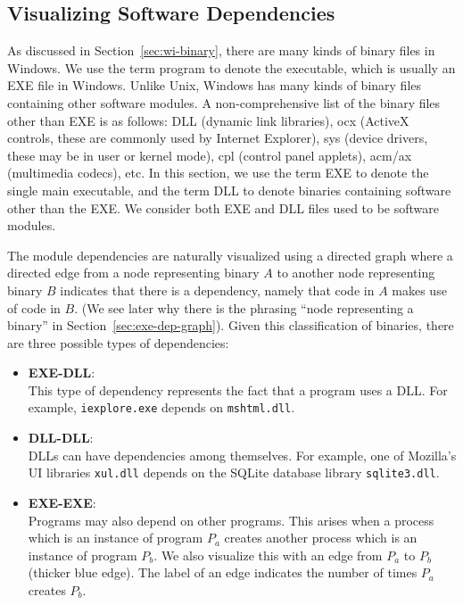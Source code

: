\subsection{Visualizing Software Dependencies}

As discussed in Section~\ref{sec:wi-binary},
there are many kinds of binary files in Windows.
We use the term program to denote the executable, which
is usually an EXE file in Windows.
Unlike Unix, Windows has many kinds of binary files containing
other software modules.
A non-comprehensive list of the binary files other than EXE
is as follows:
DLL (dynamic link libraries), ocx (ActiveX controls,
these are commonly used by Internet Explorer), sys (device
drivers, these may be in user or kernel mode), cpl (control panel applets),
acm/ax (multimedia codecs), etc.
In this section, we use the term EXE to denote the single main executable,
and the term DLL to denote binaries containing software other than the EXE.
We consider both EXE and DLL files used to be software modules.

The module dependencies are naturally visualized using a directed graph where
a directed edge from a node representing binary $A$ to another
node representing binary $B$ indicates that there is
a dependency, namely that code in $A$ makes use of code in $B$.
(We see later why there is the phrasing ``node representing a binary'' in
Section~\ref{sec:exe-dep-graph}).
Given this classification of binaries, there are three possible
types of dependencies:
\begin{itemize}
\item {\bf EXE-DLL}: \\
This type of dependency represents the fact that a program uses a DLL.
For example, {\tt iexplore.exe} depends on {\tt mshtml.dll}.
\item {\bf DLL-DLL}: \\
DLLs can have dependencies among themselves.
For example, one of Mozilla's UI libraries {\tt xul.dll} depends on the SQLite
database library {\tt sqlite3.dll}.
\item {\bf EXE-EXE}: \\
Programs may also depend on other programs. This arises when a process
which is an instance of program $P_a$ creates another process
which is an instance of program $P_b$.
We also visualize this with an edge from $P_a$ to $P_b$ (thicker blue edge).
The label of an edge indicates the number of times $P_a$ creates $P_b$.
\end{itemize}

